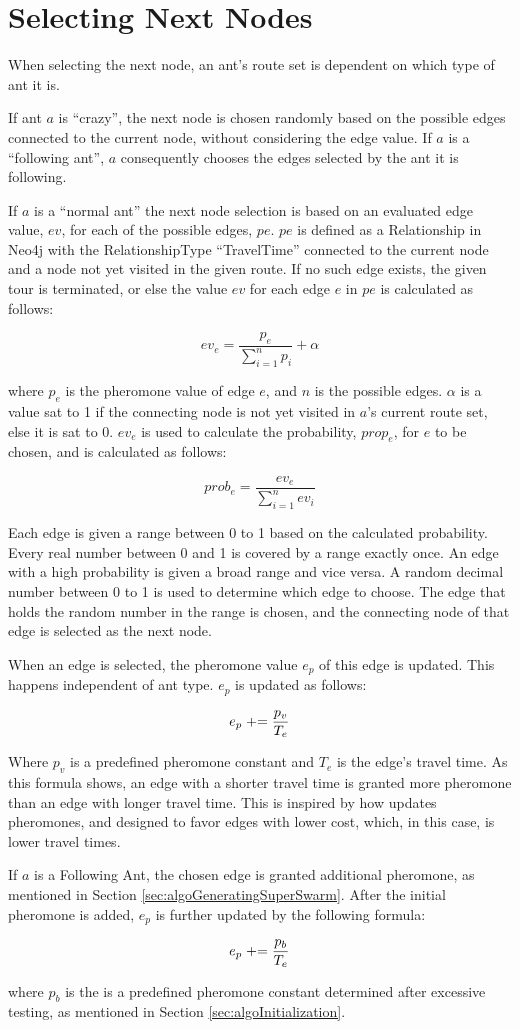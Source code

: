 \section{Selecting Next Nodes}
\label{sec:selectingNextNode}

When selecting the next node, an ant's route set is dependent on which type of ant it is. 

If ant $a$ is ``crazy'', the next node is chosen randomly based on the possible edges connected to the current node, without considering the edge value. If $a$ is a ``following ant'', $a$ consequently chooses the edges selected by the ant it is following.  

If $a$ is a ``normal ant'' the next node selection is based on an evaluated edge value, $ev$, for each of the possible edges, $pe$. $pe$ is defined as a Relationship in Neo4j with the RelationshipType ``TravelTime'' connected to the current node and a node not yet visited in the given route. If no such edge exists, the given tour is terminated, or else the value $ev$ for each edge $e$ in $pe$ is calculated as follows: 

$$ev_e = \frac{p_e}{\sum\limits^{n}_{i=1}p_i} + \alpha $$

where $p_e$ is the pheromone value of edge $e$, and $n$ is the possible edges. $\alpha$ is a value sat to 1 if the connecting node is not yet visited in $a$'s current route set, else it is sat to 0.
$ev_e$ is used to calculate the probability, $prop_e$, for $e$ to be chosen, and is calculated as follows:

$$prob_e = \frac{ev_e}{\sum\limits^{n}_{i=1}ev_i}$$

Each edge is given a range between 0 to 1 based on the calculated probability. Every real number between 0 and 1 is covered by a range exactly once. An edge with a high probability is given a broad range and vice versa. A random decimal number between 0 to 1 is used to determine which edge to choose. The edge that holds the random number in the range is chosen, and the connecting node of that edge is selected as the next node. 

When an edge is selected, the pheromone value $e_p$ of this edge is updated. This happens independent of ant type. $e_p$ is updated as follows:

$$e_p \mathrel{+}= \frac{p_v}{T_e}$$ 

Where $p_v$ is a predefined pheromone constant and $T_e$ is the edge's travel time. As this formula shows, an edge with a shorter travel time is granted more pheromone than an edge with longer travel time. This is inspired by how \citet{hsiao04} updates pheromones, and designed to favor edges with lower cost, which, in this case, is lower travel times. 

If $a$ is a Following Ant, the chosen edge is granted additional pheromone, as mentioned in Section \vref{sec:algoGeneratingSuperSwarm}. After the initial pheromone is added, $e_p$ is further updated by the following formula:

$$e_p \mathrel{+}= \frac{p_b}{T_e}$$ 

where $p_b$ is the is a predefined pheromone constant determined after excessive testing, as mentioned in Section \vref{sec:algoInitialization}.
